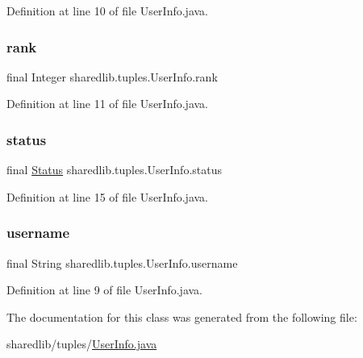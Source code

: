 Definition at line 10 of file User\+Info.\+java.

\hypertarget{classsharedlib_1_1tuples_1_1_user_info_acc55d52c1e93fbdc544907692ab5a45c}{}\label{classsharedlib_1_1tuples_1_1_user_info_acc55d52c1e93fbdc544907692ab5a45c} 
\subsubsection{\texorpdfstring{rank}{rank}}
{\footnotesize\ttfamily final Integer sharedlib.\+tuples.\+User\+Info.\+rank}



Definition at line 11 of file User\+Info.\+java.

\hypertarget{classsharedlib_1_1tuples_1_1_user_info_a2122f345a07ca469c305e79827797563}{}\label{classsharedlib_1_1tuples_1_1_user_info_a2122f345a07ca469c305e79827797563} 
\subsubsection{\texorpdfstring{status}{status}}
{\footnotesize\ttfamily final \hyperlink{enumsharedlib_1_1tuples_1_1_user_info_1_1_status}{Status} sharedlib.\+tuples.\+User\+Info.\+status}



Definition at line 15 of file User\+Info.\+java.

\hypertarget{classsharedlib_1_1tuples_1_1_user_info_ae2aece1a833e9963fa7dc508992d4cf0}{}\label{classsharedlib_1_1tuples_1_1_user_info_ae2aece1a833e9963fa7dc508992d4cf0} 
\subsubsection{\texorpdfstring{username}{username}}
{\footnotesize\ttfamily final String sharedlib.\+tuples.\+User\+Info.\+username}



Definition at line 9 of file User\+Info.\+java.



The documentation for this class was generated from the following file\+:\begin{DoxyCompactItemize}
\item 
sharedlib/tuples/\hyperlink{_user_info_8java}{User\+Info.\+java}\end{DoxyCompactItemize}
